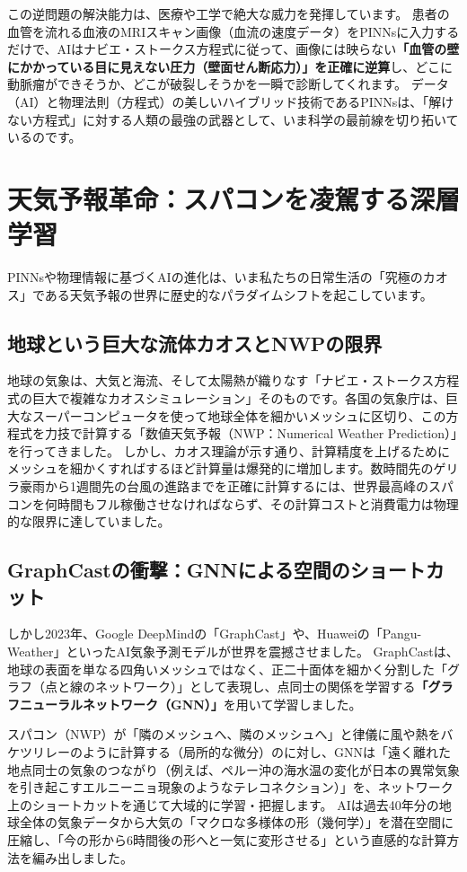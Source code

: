 この逆問題の解決能力は、医療や工学で絶大な威力を発揮しています。 患者の血管を流れる血液のMRIスキャン画像（血流の速度データ）をPINNsに入力するだけで、AIはナビエ・ストークス方程式に従って、画像には映らない\textbf{「血管の壁にかかっている目に見えない圧力（壁面せん断応力）」を正確に逆算}し、どこに動脈瘤ができそうか、どこが破裂しそうかを一瞬で診断してくれます。 データ（AI）と物理法則（方程式）の美しいハイブリッド技術であるPINNsは、「解けない方程式」に対する人類の最強の武器として、いま科学の最前線を切り拓いているのです。

\section{天気予報革命：スパコンを凌駕する深層学習}

PINNsや物理情報に基づくAIの進化は、いま私たちの日常生活の「究極のカオス」である天気予報の世界に歴史的なパラダイムシフトを起こしています。

\subsection{地球という巨大な流体カオスとNWPの限界}

地球の気象は、大気と海流、そして太陽熱が織りなす「ナビエ・ストークス方程式の巨大で複雑なカオスシミュレーション」そのものです。各国の気象庁は、巨大なスーパーコンピュータを使って地球全体を細かいメッシュに区切り、この方程式を力技で計算する「数値天気予報（NWP：Numerical Weather Prediction）」を行ってきました。 しかし、カオス理論が示す通り、計算精度を上げるためにメッシュを細かくすればするほど計算量は爆発的に増加します。数時間先のゲリラ豪雨から1週間先の台風の進路までを正確に計算するには、世界最高峰のスパコンを何時間もフル稼働させなければならず、その計算コストと消費電力は物理的な限界に達していました。

\subsection{GraphCastの衝撃：GNNによる空間のショートカット}

しかし2023年、Google DeepMindの「GraphCast」や、Huaweiの「Pangu-Weather」といったAI気象予測モデルが世界を震撼させました。 GraphCastは、地球の表面を単なる四角いメッシュではなく、正二十面体を細かく分割した「グラフ（点と線のネットワーク）」として表現し、点同士の関係を学習する\textbf{「グラフニューラルネットワーク（GNN）」}を用いて学習しました。

スパコン（NWP）が「隣のメッシュへ、隣のメッシュへ」と律儀に風や熱をバケツリレーのように計算する（局所的な微分）のに対し、GNNは「遠く離れた地点同士の気象のつながり（例えば、ペルー沖の海水温の変化が日本の異常気象を引き起こすエルニーニョ現象のようなテレコネクション）」を、ネットワーク上のショートカットを通じて大域的に学習・把握します。 AIは過去40年分の地球全体の気象データから大気の「マクロな多様体の形（幾何学）」を潜在空間に圧縮し、「今の形から6時間後の形へと一気に変形させる」という直感的な計算方法を編み出しました。

